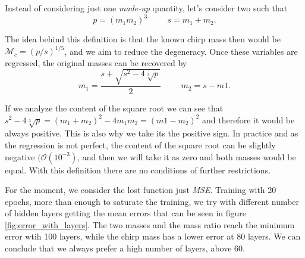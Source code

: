 \documentclass[prd,aps,twocolumn,a4paper,showkeys,nofootinbib]{article}
\begin{document}
Instead of considering just one \textit{made-up} quantity, let's consider two such that
\begin{equation}
p=(m_1m_2)^3 \hspace{1cm} s=m_1+m_2.
\end{equation} 

The idea behind this definition is that the known chirp mass then would be $\mathcal{M}_c=(p/s)^{1/5}$, and we aim to reduce the degeneracy. Once these variables are regressed, the original masses can be recovered by
\begin{equation}
m_1=\frac{s+\sqrt{s^2-4\sqrt[3]{p}}}{2} \hspace{1cm} m_2=s-m1.
\end{equation}

If we analyze the content of the square root we can see that $s^2-4\sqrt[3]{p}=(m_1+m_2)^2-4m_1m_2=(m1-m_2)^2$ and therefore it would be always positive. This is also why we take its the positive sign. In practice and as the regression is not perfect, the content of the square root can be slightly negative $(\mathcal{O}(10^{-3})$, and then we will take it as zero and both masses would be equal. With this definition there are no conditions of further restrictions.

For the moment, we consider the lost function just \textit{MSE}. Training with 20 epochs, more than enough to saturate the training, we try with different number of hidden layers getting the mean errors that can be seen in figure \ref{fig:error_with_layers}. The two masses and the mass ratio reach the minimum error wtih 100 layers, while the chirp mass has a lower error at 80 layers. We can conclude that we always prefer a high number of layers, above 60.
\end{document}
